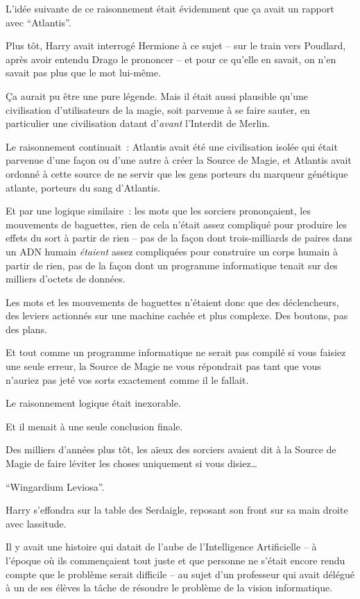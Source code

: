 L'idée suivante de ce raisonnement était évidemment que ça avait un rapport avec “Atlantis”.

Plus tôt, Harry avait interrogé Hermione à ce sujet -- sur le train vers Poudlard, après avoir entendu Drago le prononcer -- et pour ce qu'elle en savait, on n'en savait pas plus que le mot lui-même.

Ça aurait pu être une pure légende.
Mais il était aussi plausible qu'une civilisation d'utilisateurs de la magie, soit parvenue à se faire sauter, en particulier une civilisation datant d'\emph{avant} l'Interdit de Merlin.

Le raisonnement continuait~: Atlantis avait été une civilisation isolée qui était parvenue d'une façon ou d'une autre à créer la Source de Magie, et Atlantis avait ordonné à cette source de ne servir que les gens porteurs du marqueur génétique atlante, porteurs du sang d'Atlantis.

Et par une logique similaire~: les mots que les sorciers prononçaient, les mouvements de baguettes, rien de cela n'était assez compliqué pour produire les effets du sort à partir de rien -- pas de la façon dont trois-milliards de paires dans un ADN humain \emph{étaient} assez compliquées pour construire un corps humain à partir de rien, pas de la façon dont un programme informatique tenait sur des milliers d'octets de données.

Les mots et les mouvements de baguettes n'étaient donc que des déclencheurs, des leviers actionnés sur une machine cachée et plus complexe.
Des boutons, pas des plans.

Et tout comme un programme informatique ne serait pas compilé si vous faisiez une seule erreur, la Source de Magie ne vous répondrait pas tant que vous n'auriez pas jeté vos sorts exactement comme il le fallait.

Le raisonnement logique était inexorable.

Et il menait à une seule conclusion finale.

Des milliers d'années plus tôt, les aïeux des sorciers avaient dit à la Source de Magie de faire léviter les choses uniquement si vous disiez…

“Wingardium Leviosa”.

Harry s'effondra sur la table des Serdaigle, reposant son front sur sa main droite avec lassitude.

Il y avait une histoire qui datait de l'aube de l'Intelligence Artificielle -- à l'époque où ils commençaient tout juste et que personne ne s'était encore rendu compte que le problème serait difficile -- au sujet d'un professeur qui avait délégué à un de ses élèves la tâche de résoudre le problème de la vision informatique.

